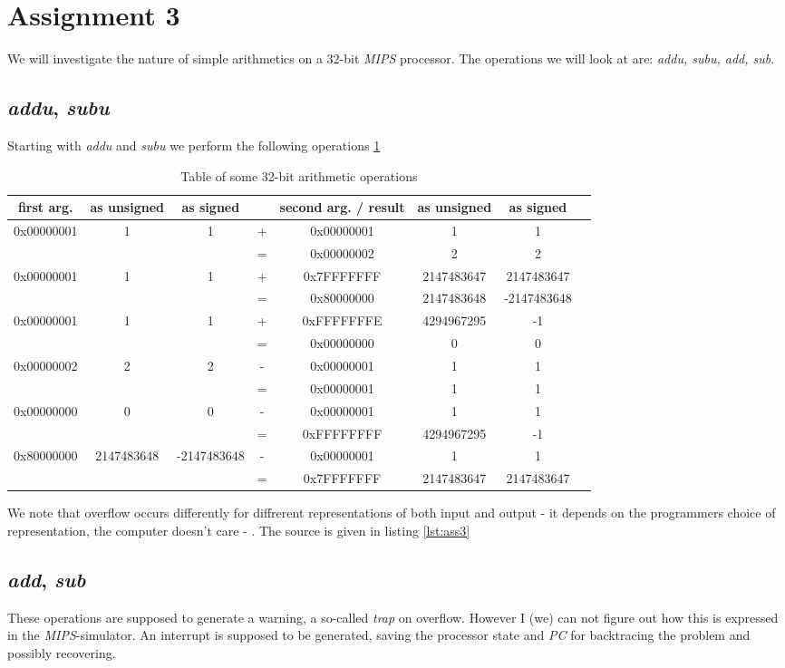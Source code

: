 \section{Assignment 3}
We will investigate the nature of simple arithmetics on a 32-bit \emph{MIPS}
processor. The operations we will look at are: \emph{addu, subu, add, sub}.

\subsection{\emph{addu}, \emph{subu}}
Starting with \emph{addu} and \emph{subu} we perform the following operations
\ref{optable}

 \begin{table}[ht]
\centering
\begin{tabular}{c c c c c c c c}
first arg. & as unsigned & as signed &  & second arg. / result & as unsigned &
as signed\\\hline
0x00000001 & 1 & 1 & + & 0x00000001 & 1 & 1\\
&  &  & = & 0x00000002 & 2 & 2\\ \hline
0x00000001 & 1 & 1 & + & 0x7FFFFFFF & 2147483647 & 2147483647\\
&  &  & = & 0x80000000 & 2147483648 & -2147483648\\\hline
0x00000001 & 1 & 1 & + & 0xFFFFFFFE & 4294967295 & -1\\
&  &  & = & 0x00000000 & 0 & 0\\\hline
0x00000002 & 2 & 2 & - & 0x00000001 & 1 & 1\\
&  &  & = & 0x00000001 & 1 & 1\\\hline
0x00000000 & 0 & 0 & - & 0x00000001 & 1 & 1\\
&  &  & = & 0xFFFFFFFF & 4294967295 & -1\\\hline
0x80000000 & 2147483648 & -2147483648 & - & 0x00000001 & 1 & 1\\
&  &  & = & 0x7FFFFFFF & 2147483647 & 2147483647\\\hline
\end{tabular}
\caption{Table of some 32-bit arithmetic operations}
\label{optable}
\end{table}
We note that overflow occurs differently for diffrerent representations of both
input and output - it depends on the programmers choice of representation, the
computer doesn't care - .
The source is given in listing \ref{lst:ass3} 

\subsection{\emph{add}, \emph{sub}}
These operations are supposed to generate a warning, a so-called \emph{trap} on
overflow. However I (we) can not figure out how this is expressed in the
\emph{MIPS}-simulator. An interrupt is supposed to be generated, saving the
processor state and \emph{PC} for backtracing the problem and possibly
recovering.
